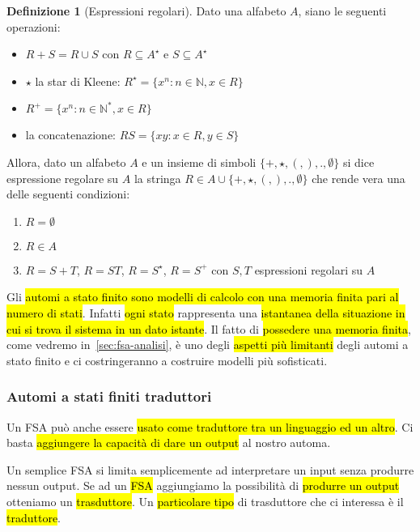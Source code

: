 \documentclass[a4paper,11pt,oneside]{article}
\theoremstyle{plain}
\theoremstyle{definition}
\newtheorem{defn}{Definizione}[section]
\theoremstyle{remark}
\begin{document}
\begin{defn}[Espressioni regolari]\label{def:regex}
  Dato una alfabeto $A$, siano le seguenti operazioni:

  \begin{itemize}
    \item $R + S = R \cup S$ con $R \subseteq A^\star$ e $S \subseteq A^\star$
    \item $\star$ la star di Kleene:
      $R^\star = \{x^n : n \in \mathbb{N}, x \in R\}$
    \item $R^+ = \{x^n : n \in \mathbb{N}^*, x \in R\}$
    \item la concatenazione: $RS = \{xy : x \in R, y \in S\}$
  \end{itemize}

  Allora, dato un alfabeto $A$ e un insieme di simboli
  $\{+,\star,(,),.,\emptyset\}$ si dice espressione regolare su $A$ la stringa
  $R \in A \cup \{+,\star,(,),.,\emptyset\}$ che rende vera una delle seguenti
  condizioni:

  \begin{enumerate}
    \item $R = \emptyset$
    \item $R \in A$
    \item $R = S + T$, $R = ST$, $R = S^\star$, $R = S^+$ con $S,T$ espressioni
      regolari su $A$
  \end{enumerate}
\end{defn}

Gli \hl{automi a stato finito sono modelli di calcolo con una memoria finita
pari al numero di stati}. Infatti \hl{ogni stato} rappresenta una \hl{istantanea
della situazione in cui si trova il sistema in un dato istante}. Il fatto di
\hl{possedere una memoria finita}, come vedremo in~\ref{sec:fsa-analisi}, è uno
degli \hl{aspetti più limitanti} degli automi a stato finito e ci costringeranno
a costruire modelli più sofisticati.

\subsubsection{Automi a stati finiti traduttori}\label{sec:fsa-trad}

Un FSA può anche essere \hl{usato come traduttore tra un linguaggio ed un
altro}. Ci basta \hl{aggiungere la capacità di dare un output} al nostro automa.

Un semplice FSA si limita semplicemente ad interpretare un input senza produrre
nessun output. Se ad un \hl{FSA} aggiungiamo la possibilità di \hl{produrre un
output} otteniamo un \hl{trasduttore}. Un \hl{particolare tipo} di trasduttore
che ci interessa è il \hl{traduttore}.
\end{document}
